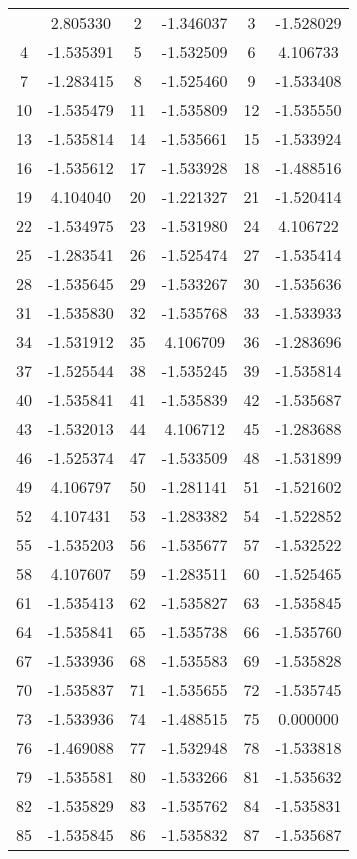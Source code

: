 \documentclass[12pt]{article}
\begin{document}
\begin{longtable}{@{}cc|cc|cc@{}}
\bottomrule
\endlastfoot
1 & 2.805330 & 2 & -1.346037 & 3 & -1.528029 \\
4 & -1.535391 & 5 & -1.532509 & 6 & 4.106733 \\
7 & -1.283415 & 8 & -1.525460 & 9 & -1.533408 \\
10 & -1.535479 & 11 & -1.535809 & 12 & -1.535550 \\
13 & -1.535814 & 14 & -1.535661 & 15 & -1.533924 \\
16 & -1.535612 & 17 & -1.533928 & 18 & -1.488516 \\
19 & 4.104040 & 20 & -1.221327 & 21 & -1.520414 \\
22 & -1.534975 & 23 & -1.531980 & 24 & 4.106722 \\
25 & -1.283541 & 26 & -1.525474 & 27 & -1.535414 \\
28 & -1.535645 & 29 & -1.533267 & 30 & -1.535636 \\
31 & -1.535830 & 32 & -1.535768 & 33 & -1.533933 \\
34 & -1.531912 & 35 & 4.106709 & 36 & -1.283696 \\
37 & -1.525544 & 38 & -1.535245 & 39 & -1.535814 \\
40 & -1.535841 & 41 & -1.535839 & 42 & -1.535687 \\
43 & -1.532013 & 44 & 4.106712 & 45 & -1.283688 \\
46 & -1.525374 & 47 & -1.533509 & 48 & -1.531899 \\
49 & 4.106797 & 50 & -1.281141 & 51 & -1.521602 \\
52 & 4.107431 & 53 & -1.283382 & 54 & -1.522852 \\
55 & -1.535203 & 56 & -1.535677 & 57 & -1.532522 \\
58 & 4.107607 & 59 & -1.283511 & 60 & -1.525465 \\
61 & -1.535413 & 62 & -1.535827 & 63 & -1.535845 \\
64 & -1.535841 & 65 & -1.535738 & 66 & -1.535760 \\
67 & -1.533936 & 68 & -1.535583 & 69 & -1.535828 \\
70 & -1.535837 & 71 & -1.535655 & 72 & -1.535745 \\
73 & -1.533936 & 74 & -1.488515 & 75 & 0.000000 \\
76 & -1.469088 & 77 & -1.532948 & 78 & -1.533818 \\
79 & -1.535581 & 80 & -1.533266 & 81 & -1.535632 \\
82 & -1.535829 & 83 & -1.535762 & 84 & -1.535831 \\
85 & -1.535845 & 86 & -1.535832 & 87 & -1.535687 \\

\end{longtable}
\end{document}
